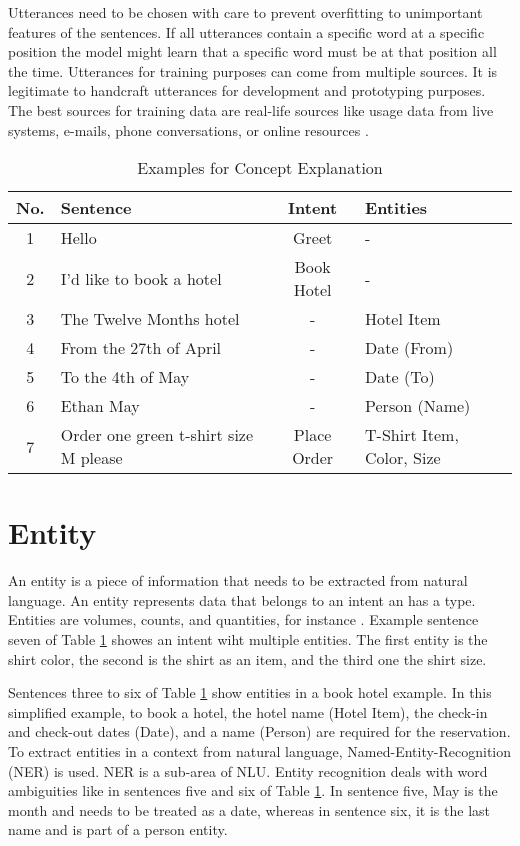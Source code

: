 Utterances need to be chosen with care to prevent overfitting to unimportant features of the sentences.
If all utterances contain a specific word at a specific position the model 
might learn that a specific word must be at that position all the time.
Utterances for training purposes can come from multiple sources.
It is legitimate to handcraft utterances for development and prototyping purposes.
The best sources for training data are real-life sources like usage data from live systems, e-mails, phone conversations, or online resources \cite{singhbuilding}.    


\begin{table}[H]
    \centering
    \begin{tabular}{ c | l | c | l }
        No. & Sentence & Intent & Entities \\ \hline \hline
        1 & Hello & Greet & - \\ \hline
        2 & I'd like to book a hotel & Book Hotel & - \\ \hline
        3 & The Twelve Months hotel & - & Hotel Item\\ \hline
        4 & From the 27th of April & - & Date (From)\\ \hline
        5 & To the 4th of May & - & Date (To)\\ \hline
        6 & Ethan May & - & Person (Name)\\ \hline
        7 & Order one green t-shirt size M please & Place Order & T-Shirt Item, Color, Size \\ \hline
    \end{tabular}
    \caption{Examples for Concept Explanation} \label{tab:example_sentences}
\end{table} \noindent

\section{Entity} \label{sec:entity}
An entity is a piece of information that needs to be extracted from natural language.
An entity represents data that belongs to an intent an has a type.
Entities are volumes, counts, and quantities, for instance \cite{buiildChatbotsPython}.
Example sentence seven of Table \ref{tab:example_sentences} showes an intent wiht multiple entities.
The first entity is the shirt color,  the second is the shirt as an item, and the third one the shirt size.

Sentences three to six of Table \ref{tab:example_sentences} show entities in a book hotel example.
In this simplified example, to book a hotel, the hotel name (Hotel Item), the check-in and check-out dates (Date), and a name (Person) are required for the reservation.
To extract entities in a context from natural language, Named-Entity-Recognition (NER) is used.
NER is a sub-area of NLU.
Entity recognition deals with word ambiguities like in sentences five and six of Table \ref{tab:example_sentences}.
In sentence five, May is the month and needs to be treated as a date, whereas in sentence six, it is the last name and is part of a person entity. \

